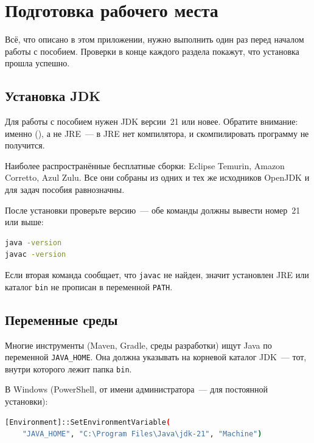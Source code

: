 \chapter{Подготовка рабочего места}
\label{app:setup}

Всё, что описано в этом приложении, нужно выполнить один раз перед началом работы
с пособием. Проверки в конце каждого раздела покажут, что установка прошла успешно.

\section{Установка JDK}

Для работы с пособием нужен JDK версии~21 или новее. Обратите внимание: именно
 (), а не JRE~--- в JRE нет компилятора,
и скомпилировать программу не получится.

Наиболее распространённые бесплатные сборки: Eclipse Temurin, Amazon Corretto,
Azul Zulu. Все они собраны из одних и тех же исходников OpenJDK и для задач
пособия равнозначны.

После установки проверьте версию~--- обе команды должны вывести номер~21 или выше:

\begin{lstlisting}[language=bash,caption={Проверка установки JDK},label={lst:app-jdk}]
java -version
javac -version
\end{lstlisting}

Если вторая команда сообщает, что \texttt{javac} не найден, значит установлен JRE
или каталог \texttt{bin} не прописан в переменной \texttt{PATH}.

\section{Переменные среды}

Многие инструменты (Maven, Gradle, среды разработки) ищут Java по переменной
\texttt{JAVA\_HOME}. Она должна указывать на корневой каталог JDK~--- тот, внутри
которого лежит папка \texttt{bin}.

В Windows (PowerShell, от имени администратора~--- для постоянной установки):

\begin{lstlisting}[language=bash,caption={Настройка JAVA\_HOME в Windows},label={lst:app-winenv}]
[Environment]::SetEnvironmentVariable(
    "JAVA_HOME", "C:\Program Files\Java\jdk-21", "Machine")
\end{lstlisting}

